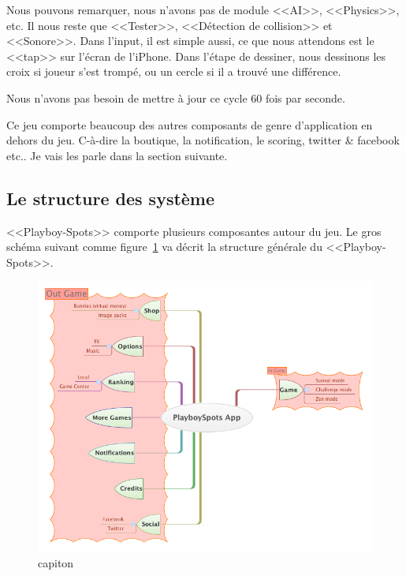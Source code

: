 Nous pouvons remarquer, nous n'avons pas de module <<AI>>, <<Physics>>, etc. Il nous reste que <<Tester>>, <<Détection de collision>> et <<Sonore>>. Dans l'input, il est simple aussi, ce que nous attendons est le <<tap>> sur l'écran de l'iPhone. Dans l'étape de dessiner, nous dessinons les croix si joueur s'est trompé, ou un cercle si il a trouvé une différence.

Nous n'avons pas besoin de mettre à jour ce cycle 60 fois par seconde. 

Ce jeu comporte beaucoup des autres composants de genre d'application en dehors du jeu. C-à-dire la boutique, la notification, le scoring, twitter \& facebook etc..
Je vais les parle dans la section suivante.


\subsection{Le structure des système} %

<<Playboy-Spots>> comporte plusieurs composantes autour du jeu. Le gros schéma suivant comme figure~\ref{fig:XMinds_PlayboySpotsApp} va décrit la structure générale du <<Playboy-Spots>>.
\begin{figure}[htbp]
	\centering
		\includegraphics[width=6in]{XMinds/PlayboySpotsApp.png}
	\caption{capiton}
	\label{fig:XMinds_PlayboySpotsApp}
\end{figure}



